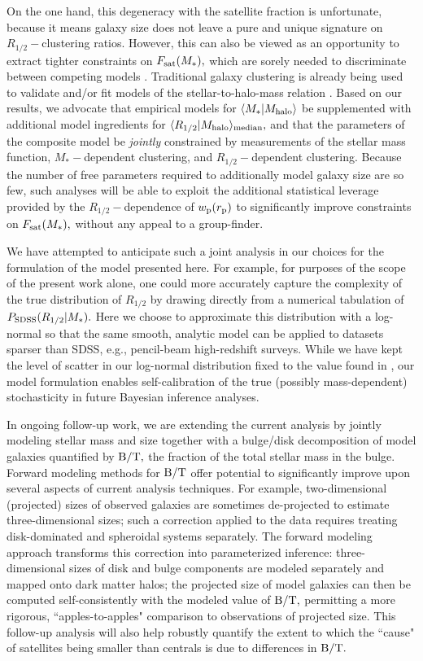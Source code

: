 \documentclass[usenatbib,usegraphicx,letterpaper]{mn2e}
\newcommand{\rhalf}{R_{1/2}}
\newcommand{\mstar}{M_{\ast}}
\newcommand{\mhalo}{M_{\rm halo}}
\newcommand{\rproj}{r_{\rm p}}
\newcommand{\wproj}{w_{\rm p}}
\newcommand{\mean}[2]{\langle{#1}\vert{#2}\rangle}
\newcommand{\median}[2]{\langle{#1}\vert{#2}\rangle_{\rm median}}
\begin{document}
On the one hand, this degeneracy with the satellite fraction is unfortunate, because it means galaxy size does not leave a pure and unique signature on $\rhalf-$clustering ratios. However, this can also be viewed as an opportunity to extract tighter constraints on $F_{\rm sat}(\mstar),$ which are sorely needed to discriminate between competing models \citep{watson_conroy13}. Traditional galaxy clustering is already being used to validate and/or fit models of the stellar-to-halo-mass relation \citep[e.g.,][]{leauthaud_etal11,moster_etal10,behroozi13_smhm,lehmann_etal15}. Based on our results, we advocate that empirical models for $\mean{\mstar}{\mhalo}$ be supplemented with additional model ingredients for $\median{\rhalf}{\mhalo},$ and that the parameters of the composite model be {\em jointly} constrained by measurements of the stellar mass function, $\mstar-$dependent clustering, and $\rhalf-$dependent clustering. Because the number of free parameters required to additionally model galaxy size are so few, such analyses will be able to exploit the additional statistical leverage provided by the $\rhalf-$dependence of $\wproj(\rproj)$ to significantly improve constraints on $F_{\rm sat}(\mstar),$ without any appeal to a group-finder.  

We have attempted to anticipate such a joint analysis in our choices for the formulation of the model presented here. For example, for purposes of the scope of the present work alone, one could more accurately capture the complexity of the true distribution of $\rhalf$ by drawing directly from a numerical tabulation of $P_{\rm SDSS}(\rhalf\vert\mstar).$ Here we choose to approximate this distribution with a log-normal so that the same smooth, analytic model can be applied to datasets sparser than SDSS, e.g., pencil-beam high-redshift surveys. While we have kept the level of scatter in our log-normal distribution fixed to the value found in \cite{somerville_etal17}, our model formulation enables self-calibration of the true (possibly mass-dependent) stochasticity in future Bayesian inference analyses. 

In ongoing follow-up work, we are extending the current analysis by jointly modeling stellar mass and size together with a bulge/disk decomposition of model galaxies quantified by ${\rm B/T},$ the fraction of the total stellar mass in the bulge. Forward modeling methods for ${\rm B/T}$ offer potential to significantly improve upon several aspects of current analysis techniques. For example, two-dimensional (projected) sizes of observed galaxies are sometimes de-projected to estimate three-dimensional sizes; such a correction applied to the data requires treating disk-dominated and spheroidal systems separately. The forward modeling approach transforms this correction into parameterized inference: three-dimensional sizes of disk and bulge components are modeled separately and mapped onto dark matter halos; the projected size of model galaxies can then be computed self-consistently with the modeled value of ${\rm B/T},$ permitting a more rigorous, ``apples-to-apples" comparison to observations of projected size. This follow-up analysis will also help robustly quantify the extent to which the ``cause" of satellites being smaller than centrals is due to differences in ${\rm B/T}.$ 
\end{document}
